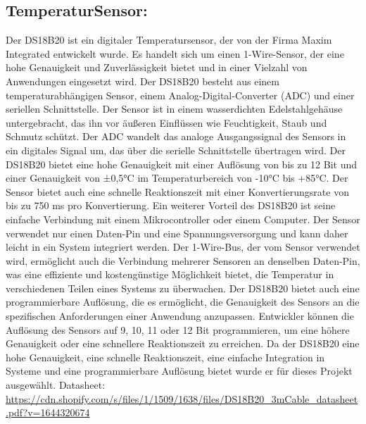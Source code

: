\subsection*{TemperaturSensor:}
Der DS18B20 ist ein digitaler Temperatursensor, der von der Firma Maxim Integrated entwickelt wurde. Es handelt sich um einen 1-Wire-Sensor, der eine hohe Genauigkeit und Zuverlässigkeit bietet und in einer Vielzahl von Anwendungen eingesetzt wird.
Der DS18B20 besteht aus einem temperaturabhängigen Sensor, einem Analog-Digital-Converter (ADC) und einer seriellen Schnittstelle. Der Sensor ist in einem wasserdichten Edelstahlgehäuse untergebracht, das ihn vor äußeren Einflüssen wie Feuchtigkeit, Staub und Schmutz schützt. Der ADC wandelt das analoge Ausgangssignal des Sensors in ein digitales Signal um, das über die serielle Schnittstelle übertragen wird.
Der DS18B20 bietet eine hohe Genauigkeit mit einer Auflösung von bis zu 12 Bit und einer Genauigkeit von ±0,5°C im Temperaturbereich von -10°C bis +85°C. Der Sensor bietet auch eine schnelle Reaktionszeit mit einer Konvertierungsrate von bis zu 750 ms pro Konvertierung.
Ein weiterer Vorteil des DS18B20 ist seine einfache Verbindung mit einem Mikrocontroller oder einem Computer. Der Sensor verwendet nur einen Daten-Pin und eine Spannungsversorgung und kann daher leicht in ein System integriert werden. Der 1-Wire-Bus, der vom Sensor verwendet wird, ermöglicht auch die Verbindung mehrerer Sensoren an denselben Daten-Pin, was eine effiziente und kostengünstige Möglichkeit bietet, die Temperatur in verschiedenen Teilen eines Systems zu überwachen.
Der DS18B20 bietet auch eine programmierbare Auflösung, die es ermöglicht, die Genauigkeit des Sensors an die spezifischen Anforderungen einer Anwendung anzupassen. Entwickler können die Auflösung des Sensors auf 9, 10, 11 oder 12 Bit programmieren, um eine höhere Genauigkeit oder eine schnellere Reaktionszeit zu erreichen.
Da der DS18B20 eine hohe Genauigkeit, eine schnelle Reaktionszeit, eine einfache Integration in Systeme und eine programmierbare Auflösung bietet wurde er für dieses Projekt ausgewählt. 
\newline
Datasheet: \url{https://cdn.shopify.com/s/files/1/1509/1638/files/DS18B20_3mCable_datasheet.pdf?v=1644320674}


\newpage
